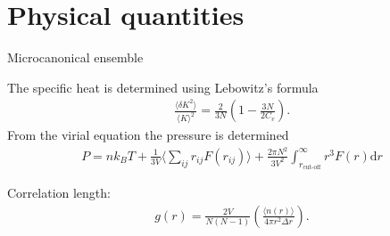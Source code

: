 \section{Physical quantities}
Microcanonical ensemble

The specific heat is determined using Lebowitz's formula \cite{cite:jos}
\begin{gather*}
    \frac{\langle \delta K^2\rangle}{\langle K\rangle^2}=\frac{2}{3N}\left( 1-\frac{3N}{2C_v}\right).
\end{gather*}
From the virial equation the pressure is determined 
\begin{gather*}
    P = nk_BT + \frac{1}{3V}\Big \langle \sum_{ij} r_{ij}F(r_{ij})\Big \rangle + \frac{2\pi N^2}{3V^2}\int_{r_{\text{cut-off}}}^{\infty}r^3 F(r) \text{d}r
\end{gather*}

Correlation length:
\begin{gather*}
    g(r)=\frac{2V}{N(N-1)}\left(\frac{\langle n(r)\rangle}{4\pi r^2\Delta r}\right).
\end{gather*}